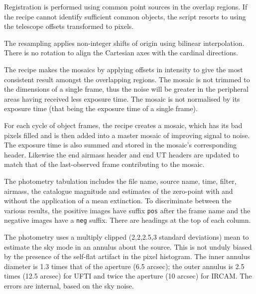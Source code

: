 \documentclass[twoside,11pt]{article}
\renewcommand{\_}{\texttt{\symbol{95}}}
\newcommand{\sstitem}{\item}
\begin{document}
{{{         \sstitem
         Registration is performed using common point sources in the
         overlap regions.  If the recipe cannot identify sufficient common
         objects, the script resorts to using the telescope offsets
         transformed to pixels.

         \sstitem
         The resampling applies non-integer shifts of origin using
         bilinear interpolation.  There is no rotation to align the
         Cartesian axes with the cardinal directions.

         \sstitem
         The recipe makes the mosaics by applying offsets in intensity
         to give the most consistent result amongst the overlapping regions.
         The mosaic is not trimmed to the dimensions of a single frame, thus
         the noise will be greater in the peripheral areas having received
         less exposure time.  The mosaic is not normalised by its exposure
         time (that being the exposure time of a single frame).

         \sstitem 
         For each cycle of object frames, the recipe creates a mosaic,
	 which has its bad pixels filled and is then added into a
	 master mosaic of improving signal to noise.  The exposure
	 time is also summed and stored in the mosaic's corresponding
	 header.  Likewise the end airmass header and end UT headers
	 are updated to match that of the last-observed frame
	 contributing to the mosaic.

         \sstitem
         The photometry tabulation includes the file name, source
         name, time, filter, airmass, the catalogue magnitude and
         estimates of the zero-point with and without the application
         of a mean extinction.  To discriminate between the various
         results, the positive images have suffix {\tt \_pos} after the
         frame name and the negative images have a {\tt \_neg} suffix.
         There are headings at the top of each column.

         \sstitem
         The photometry uses a multiply clipped (2,2,2.5,3 standard
         deviations) mean to estimate the sky mode in an annulus about
         the source.  This is not unduly biased by the presence of the
         self-flat artifact in the pixel histogram. The inner annulus
         diameter is 1.3 times that of the aperture (6.5 arcsec); the
         outer annulus is 2.5 times (12.5 arcsec) for UFTI and twice
         the aperture (10 arcsec) for IRCAM.  The errors are internal,
         based on the sky noise.

}}}
\end{document}
